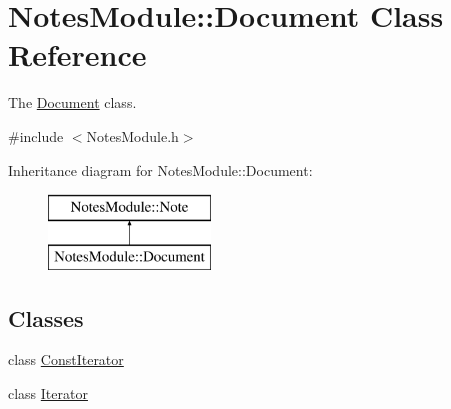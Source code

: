 \hypertarget{class_notes_module_1_1_document}{\section{Notes\-Module\-:\-:Document Class Reference}
\label{class_notes_module_1_1_document}
}


The \hyperlink{class_notes_module_1_1_document}{Document} class.  




{\ttfamily \#include $<$Notes\-Module.\-h$>$}

Inheritance diagram for Notes\-Module\-:\-:Document\-:\begin{figure}[H]
\begin{center}
\leavevmode
\includegraphics[height=2.000000cm]{class_notes_module_1_1_document}
\end{center}
\end{figure}
\subsection*{Classes}
\begin{DoxyCompactItemize}
\item 
class \hyperlink{class_notes_module_1_1_document_1_1_const_iterator}{Const\-Iterator}
\item 
class \hyperlink{class_notes_module_1_1_document_1_1_iterator}{Iterator}
\end{DoxyCompactItemize}
